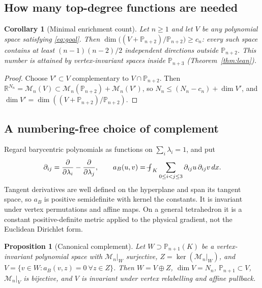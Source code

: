 \documentclass[11pt,a4paper]{article}
\newtheorem{proposition}[theorem]{Proposition}
\newtheorem{corollary}[theorem]{Corollary}
\theoremstyle{definition}
\theoremstyle{remark}
\newcommand{\M}{\mathcal M}
\newcommand{\avg}{\mathop{\mathchoice{{\textstyle\int}\mkern-15.5mu{-}\mkern2mu}{\int\mkern-12mu{-}\mkern1mu}{\int\mkern-11mu{-}}{\int\mkern-11mu{-}}}\nolimits}
\newcommand{\Pol}{\mathbb P}
\begin{document}
\subsection{How many top-degree functions are needed}

\begin{corollary}[Minimal enrichment count]
\label{cor:minimal}
Let \(n\ge1\) and let \(V\) be any polynomial space satisfying
\eqref{eq:goal}. Then \(\dim\bigl((V+\Pol_{n+2})/\Pol_{n+2}\bigr)\ge c_n\):
every such space contains at least \((n-1)(n-2)/2\) independent directions
outside \(\Pol_{n+2}\). This number is attained by vertex-invariant spaces
inside \(\Pol_{n+3}\) (Theorem~\ref{thm:lean}).
\end{corollary}

\begin{proof}
Choose \(V'\subset V\) complementary to \(V\cap\Pol_{n+2}\). Then
\(\mathbb R^{N_n}=\M_n(V)\subset\M_n(\Pol_{n+2})+\M_n(V')\), so
\(N_n\le(N_n-c_n)+\dim V'\), and \(\dim V'=\dim((V+\Pol_{n+2})/\Pol_{n+2})\).
\end{proof}

\subsection{A numbering-free choice of complement}

Regard barycentric polynomials as functions on \(\sum_i\lambda_i=1\), and put
\begin{equation}
 \partial_{ij}=\frac{\partial}{\partial\lambda_i}-\frac{\partial}{\partial\lambda_j},
 \qquad
 a_B(u,v)=\avg_K\sum_{0\le i<j\le3}\partial_{ij}u\,\partial_{ij}v\,dx .
 \label{eq:aB}
\end{equation}
Tangent derivatives are well defined on the hyperplane and span its
tangent space, so \(a_B\) is positive semidefinite with kernel the
constants. It is invariant under vertex permutations and affine maps. On
a general tetrahedron it is a constant positive-definite metric applied to
the physical gradient, not the Euclidean Dirichlet form.

\begin{proposition}[Canonical complement]
\label{prop:canonical}
Let \(W\supset\Pol_{n+1}(K)\) be a vertex-invariant polynomial space with
\(\M_n|_W\) surjective, \(Z=\ker(\M_n|_W)\), and
\(V=\{v\in W:a_B(v,z)=0\ \forall z\in Z\}\). Then \(W=V\oplus Z\),
\(\dim V=N_n\), \(\Pol_{n+1}\subset V\), \(\M_n|_V\) is bijective, and \(V\) is
invariant under vertex relabelling and affine pullback.
\end{proposition}
\end{document}
